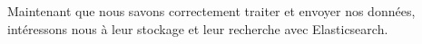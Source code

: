 Maintenant que nous savons correctement traiter et envoyer nos données, intéressons nous
à leur stockage et leur recherche avec Elasticsearch.


